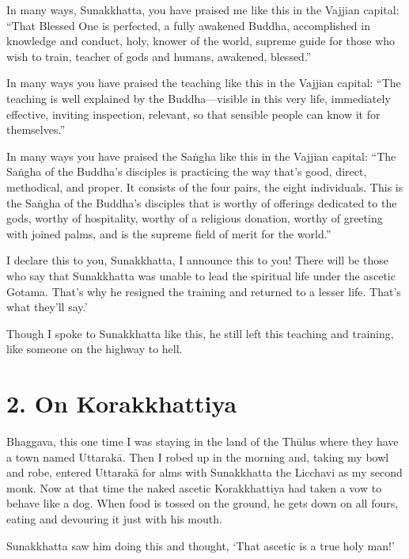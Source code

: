 \documentclass[12pt,openany]{book}%
\begin{document}
In many ways, Sunakkhatta, you have praised me like this in the Vajjian capital: “That Blessed One is perfected, a fully awakened Buddha, accomplished in knowledge and conduct, holy, knower of the world, supreme guide for those who wish to train, teacher of gods and humans, awakened, blessed.” 

In many ways you have praised the teaching like this in the Vajjian capital: “The teaching is well explained by the Buddha—visible in this very life, immediately effective, inviting inspection, relevant, so that sensible people can know it for themselves.” 

In many ways you have praised the \textsanskrit{Saṅgha} like this in the Vajjian capital: “The \textsanskrit{Saṅgha} of the Buddha’s disciples is practicing the way that’s good, direct, methodical, and proper. It consists of the four pairs, the eight individuals. This is the \textsanskrit{Saṅgha} of the Buddha’s disciples that is worthy of offerings dedicated to the gods, worthy of hospitality, worthy of a religious donation, worthy of greeting with joined palms, and is the supreme field of merit for the world.” 

I declare this to you, Sunakkhatta, I announce this to you! There will be those who say that Sunakkhatta was unable to lead the spiritual life under the ascetic Gotama. That’s why he resigned the training and returned to a lesser life. That’s what they’ll say.’ 

Though I spoke to Sunakkhatta like this, he still left this teaching and training, like someone on the highway to hell. 

\section*{2. On Korakkhattiya }

Bhaggava, this one time I was staying in the land of the \textsanskrit{Thūlus} where they have a town named \textsanskrit{Uttarakā}. Then I robed up in the morning and, taking my bowl and robe, entered \textsanskrit{Uttarakā} for alms with Sunakkhatta the Licchavi as my second monk. Now at that time the naked ascetic Korakkhattiya had taken a vow to behave like a dog. When food is tossed on the ground, he gets down on all fours, eating and devouring it just with his mouth. 

Sunakkhatta saw him doing this and thought, ‘That ascetic is a true holy man!’ 
\end{document}
